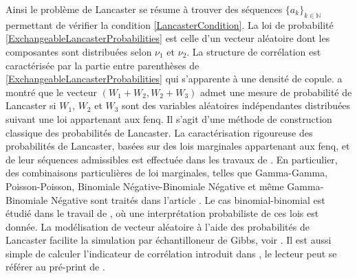 Ainsi le problème de Lancaster se résume à trouver des séquences $\{a_{k}\}_{k\in\mathbb{N}}$ permettant de vérifier la condition \eqref{LancasterCondition}. La loi de probabilité \eqref{ExchangeableLancasterProbabilities} est celle d'un vecteur aléatoire dont les composantes sont distribuées selon $\nu_{1}$ et $\nu_{2}$. La structure de corrélation est caractérisée par la partie entre parenthèses de \eqref{ExchangeableLancasterProbabilities} qui s'apparente à une densité de copule. \citet{Ea64} a montré que le vecteur $(W_{1}+W_{2},W_{2}+W_{3})$ admet une mesure de probabilité de Lancaster si $W_{1}$, $W_{2}$ et $W_{3}$ sont des variables aléatoires indépendantes distribuées suivant une loi appartenant aux \gls{fenq}. Il s'agit d'une méthode de construction classique des probabilités de Lancaster. La caractérisation rigoureuse des probabilités de Lancaster, basées sur des lois marginales appartenant aux \gls{fenq}, et de leur séquences admissibles est effectuée dans les travaux de \citet{Ko95,Ko96}. En particulier, des combinaisons particulières de loi marginales, telles que Gamma-Gamma, Poisson-Poisson, Binomiale Négative-Binomiale Négative et même Gamma-Binomiale Négative sont traités dans l'article \citet{Ko98}. Le cas binomial-binomial est étudié dans le travail de \citet{DiaGri12}, où une interprétation probabiliste de ces lois est donnée. La modélisation de vecteur aléatoire à l'aide des probabilités de Lancaster facilite la simulation par échantilloneur de Gibbs, voir \citet{DiKhSa08}. Il est aussi simple de calculer l'indicateur de corrélation introduit dans \citet{SzRiBa07}, le lecteur peut se référer au pré-print de \citet{DuEdRi15}.\\

